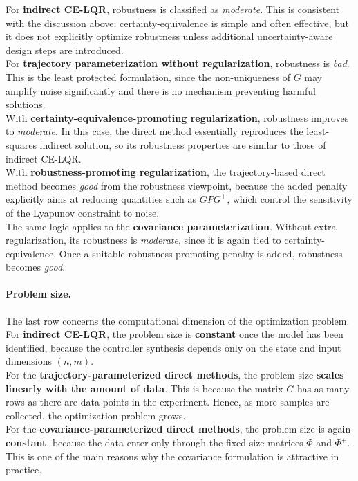 For \textbf{indirect CE-LQR}, robustness is classified as \emph{moderate}. This is consistent with the
discussion above: certainty-equivalence is simple and often effective, but it does not explicitly
optimize robustness unless additional uncertainty-aware design steps are introduced.\\
For \textbf{trajectory parameterization without regularization}, robustness is \emph{bad}. This is the
least protected formulation, since the non-uniqueness of $G$ may amplify noise significantly and
there is no mechanism preventing harmful solutions.\\
With \textbf{certainty-equivalence-promoting regularization}, robustness improves to
\emph{moderate}. In this case, the direct method essentially reproduces the least-squares indirect
solution, so its robustness properties are similar to those of indirect CE-LQR.\\
With \textbf{robustness-promoting regularization}, the trajectory-based direct method becomes
\emph{good} from the robustness viewpoint, because the added penalty explicitly aims at reducing
quantities such as $GPG^\top$, which control the sensitivity of the Lyapunov constraint to noise.\\
The same logic applies to the \textbf{covariance parameterization}. Without extra regularization, its
robustness is \emph{moderate}, since it is again tied to certainty-equivalence. Once a suitable
robustness-promoting penalty is added, robustness becomes \emph{good}.

\paragraph{Problem size.}
The last row concerns the computational dimension of the optimization problem.\\

For \textbf{indirect CE-LQR}, the problem size is \textbf{constant} once the model has been identified,
because the controller synthesis depends only on the state and input dimensions $(n,m)$.\\
For the \textbf{trajectory-parameterized direct methods}, the problem size \textbf{scales linearly with the
amount of data}. This is because the matrix $G$ has as many rows as there are data points in the
experiment. Hence, as more samples are collected, the optimization problem grows.\\
For the \textbf{covariance-parameterized direct methods}, the problem size is again \textbf{constant},
because the data enter only through the fixed-size matrices $\Phi$ and $\Phi^+$. This is one of the
main reasons why the covariance formulation is attractive in practice.\\

